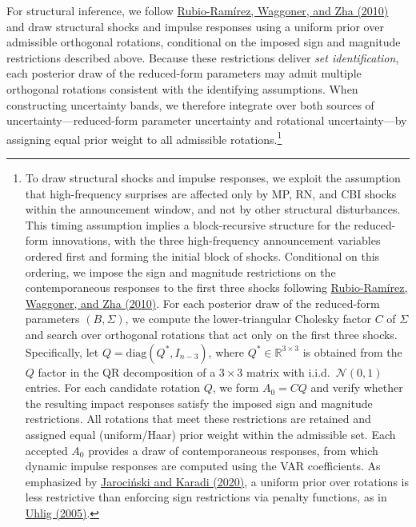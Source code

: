 \documentclass[12pt, reqno]{article}
\begin{document}
For structural inference, we follow \hyperlink{Rubio-Ramirez et al. (2010)}{Rubio-Ramírez, Waggoner, and Zha (2010)} and draw structural shocks and impulse responses using a uniform prior over admissible orthogonal rotations, conditional on the imposed sign and magnitude restrictions described above. Because these restrictions deliver \emph{set identification}, each posterior draw of the reduced-form parameters may admit multiple orthogonal rotations consistent with the identifying assumptions. When constructing uncertainty bands, we therefore integrate over both sources of uncertainty—reduced-form parameter uncertainty and rotational uncertainty—by assigning equal prior weight to all admissible rotations.\footnote{To draw structural shocks and impulse responses, we exploit the assumption that high-frequency  surprises are affected only by MP, RN, and CBI shocks within the announcement window, and not by other structural disturbances. This timing assumption implies a block-recursive structure for the reduced-form innovations, with the three high-frequency announcement variables ordered first and forming the initial block of shocks. Conditional on this ordering, we impose the sign and magnitude restrictions on the contemporaneous responses to the first three shocks following \hyperlink{Rubio-Ramirez et al. (2010)}{Rubio-Ramírez, Waggoner, and Zha (2010)}. For each posterior draw of the reduced-form parameters $(B,\Sigma)$, we compute the lower-triangular Cholesky factor $C$ of $\Sigma$ and search over orthogonal rotations that act only on the first three shocks. Specifically, let $Q=\mathrm{diag}(Q^{\ast}, I_{n-3})$, where $Q^{\ast}\in\mathbb{R}^{3\times3}$ is obtained from the $Q$ factor in the QR decomposition of a $3\times3$ matrix with i.i.d.\ $\mathcal{N}(0,1)$ entries. For each candidate rotation $Q$, we form $A_0 = C Q$ and verify whether the resulting impact responses satisfy the imposed sign and magnitude restrictions. All rotations that meet these restrictions are retained and assigned equal (uniform/Haar) prior weight within the admissible set. Each accepted $A_0$ provides a draw of contemporaneous responses, from which dynamic impulse responses are computed using the VAR coefficients. As emphasized by \hyperlink{Jarociński and Karadi (2020)}{Jarociński and Karadi (2020)}, a uniform prior over rotations is less restrictive than enforcing sign restrictions via penalty functions, as in \hyperlink{Uhlig (2005)}{Uhlig (2005)}.}
\end{document}
